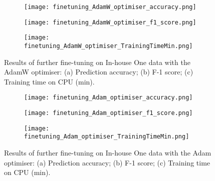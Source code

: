 \documentclass[a4paper,12pt]{article}
\newcommand{\figwidthhh}{0.45\textwidth}
\newcommand{\inghamOne}{In-house One\xspace}   %
\begin{document}
\begin{figure}[h!]
	\begin{center}
		\begin{subfigure}[b]{\figwidthhh}
			\caption{} 
			\texttt{[image: finetuning\_AdamW\_optimiser\_accuracy.png]}
		\end{subfigure}
        \hfill
		\begin{subfigure}[b]{\figwidthhh}
			\caption{}
			\texttt{[image: finetuning\_AdamW\_optimiser\_f1\_score.png]}
		\end{subfigure}
        \hfill
		\begin{subfigure}[b]{\figwidthhh}
			\caption{}
			\texttt{[image: finetuning\_AdamW\_optimiser\_TrainingTimeMin.png]}
		\end{subfigure}
	\end{center}                                                                
	\caption{Results of further fine-tuning on \inghamOne data with the AdamW optimiser: (a) Prediction accuracy; (b) F-1 score; (c) Training time on CPU (min).
	} 
\end{figure}


\begin{figure}[h!]
	\begin{center}
		\begin{subfigure}[b]{\figwidthhh}
			\caption{} 
			\texttt{[image: finetuning\_Adam\_optimiser\_accuracy.png]}
		\end{subfigure}
        \hfill
		\begin{subfigure}[b]{\figwidthhh}
			\caption{}
			\texttt{[image: finetuning\_Adam\_optimiser\_f1\_score.png]}
		\end{subfigure}
        \hfill
		\begin{subfigure}[b]{\figwidthhh}
			\caption{}
			\texttt{[image: finetuning\_Adam\_optimiser\_TrainingTimeMin.png]}
		\end{subfigure}
	\end{center}                                                                
	\caption{Results of further fine-tuning on \inghamOne data with the Adam optimiser: (a) Prediction accuracy; (b) F-1 score; (c) Training time on CPU (min).
	} 
\end{figure}


\clearpage
\end{document}
